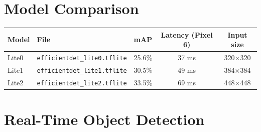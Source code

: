 \documentclass[12pt,a4paper]{article}
\begin{document}
\begin{center}
\end{center}

\bigskip

\section{Model Comparison}

\begin{center}
\begin{tabular}{llccc}
\toprule
\textbf{Model} & \textbf{File} & \textbf{mAP} & \textbf{Latency (Pixel 6)} & \textbf{Input size} \\
\midrule
Lite0 & \texttt{efficientdet\_lite0.tflite} & 25.6\% & 37 ms  & 320$\times$320 \\
Lite1 & \texttt{efficientdet\_lite1.tflite} & 30.5\% & 49 ms  & 384$\times$384 \\
Lite2 & \texttt{efficientdet\_lite2.tflite} & 33.5\% & 69 ms  & 448$\times$448 \\
\bottomrule
\end{tabular}
\end{center}

\section{Real-Time Object Detection}
\end{document}
